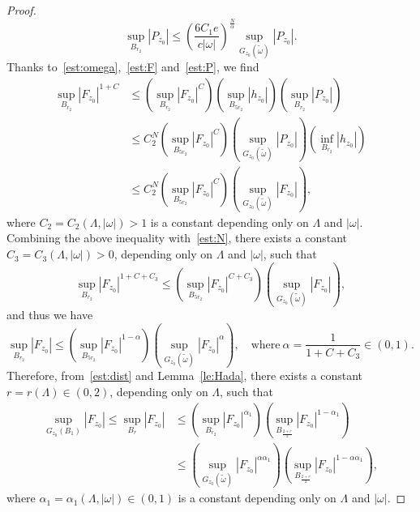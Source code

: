 \documentclass[a4paper,reqno]{amsart}
\theoremstyle{definition}
\numberwithin{equation}{section}
\begin{document}
\begin{proof}
\begin{equation}
     \sup_{B_{r_{2}}}|P_{z_{0}}|\le \left(\frac{6C_{1}e}{c|{\omega}|}\right)^{\frac{N}{\alpha}}\sup_{G_{z_{0}}(\widetilde{\omega})}|P_{z_{0}}|.
     \end{equation}
     Thanks to~\eqref{est:omega},~\eqref{est:F} and~\eqref{est:P}, we find
     \begin{equation*}
     \begin{aligned}
         \sup_{B_{r_{2}}}|F_{z_{0}}|^{1+C}
         &\le \left(\sup_{B_{r_{2}}}|F_{z_{0}}|^{C}\right)\left(\sup_{B_{5r_{2}}}|h_{z_{0}}|\right)\left(\sup_{B_{r_{2}}}|P_{z_{0}}|\right)\\
         &\le C^{N}_{2}\left(\sup_{B_{5r_{2}}}|F_{z_{0}}|^{C}\right)\left(\sup_{G_{z_{0}}({\widetilde{\omega}})}|P_{z_{0}}|\right)    \left(\inf_{B_{r_{2}}}|h_{z_{0}}|\right)\\
         &\le C^{N}_{2}\left(\sup_{B_{5r_{2}}}|F_{z_{0}}|^{C}\right)\left(\sup_{G_{z_{0}}({\widetilde{\omega}})}|F_{z_{0}}|\right),
         \end{aligned}
     \end{equation*}
     where $C_{2}=C_{2}(\Lambda,|\omega|)>1$ is a constant depending only on $\Lambda$ and $|\omega|$. Combining the above inequality with~\eqref{est:N}, there exists a constant $C_{3}=C_{3}(\Lambda,|\omega|)>0$, depending only on $\Lambda$ and $|\omega|$, such that 
     \begin{equation*}
         \sup_{B_{r_{2}}}|F_{z_{0}}|^{1+C+C_{3}}\le \left(\sup_{B_{5r_{2}}}|F_{z_{0}}|^{C+
         C_{3}  }\right)\left(\sup_{G_{z_{0}}({\widetilde{\omega}})}|F_{z_{0}}|\right),
           \end{equation*}
           and thus we have 
           \begin{equation*}
            \sup_{B_{r_{2}}}|F_{z_{0}}|\le \left(\sup_{B_{5r_{2}}}|F_{z_{0}}|^{1-\alpha}\right)
            \left(\sup_{G_{z_{0}}(\widetilde{\omega})}|F_{z_{0}}|^{\alpha}\right),\quad \mbox{where}\ \alpha=\frac{1}{1+C+C_{3}}\in (0,1).
           \end{equation*}
           Therefore, from~\eqref{est:dist} and Lemma~\ref{le:Hada}, there exists a constant $r=r(\Lambda)\in (0,2)$, depending only on $\Lambda$, such that  
           \begin{equation}\label{est:F11}
           \begin{aligned}
               \sup_{G_{z_{0}}(B_{1})}|F_{z_{0}}|\le \sup_{B_{r}}|F_{z_{0}}|
               &\le 
                \left(\sup_{B_{r_{2}}}|F_{z_{0}}|^{\alpha_{1}} \right)
                \left( \sup_{B_{\frac{2+r}{2}}}|F_{z_{0}}|^{1-\alpha_{1}}\right)\\
                &\le 
            \left(\sup_{G_{z_{0}}(\widetilde{\omega})}|F_{z_{0}}|^{\alpha\alpha_{1}}\right)
                \left(\sup_{B_{\frac{2+r}{2}}}|F_{z_{0}}|^{1-\alpha\alpha_{1}}\right),              \end{aligned}
                \end{equation}
                where $\alpha_{1}=\alpha_{1}(\Lambda,|\omega|)\in (0,1)$ is a constant depending only on $\Lambda$ and $|\omega|$.


\end{proof}
\end{document}
